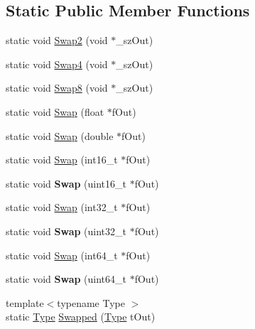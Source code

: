 \subsection*{Static Public Member Functions}
\begin{DoxyCompactItemize}
\item 
static void \hyperlink{class_assimp_1_1_byte_swap_abacbb767ce53adb84d19e6adae7d5b1d}{Swap2} (void $\ast$\+\_\+sz\+Out)
\item 
static void \hyperlink{class_assimp_1_1_byte_swap_a6717939ed8be817f262515c3c1ae2d77}{Swap4} (void $\ast$\+\_\+sz\+Out)
\item 
static void \hyperlink{class_assimp_1_1_byte_swap_a2bc7200bc6ead695450266621ee114e3}{Swap8} (void $\ast$\+\_\+sz\+Out)
\item 
static void \hyperlink{class_assimp_1_1_byte_swap_a6e60cdda6ebc1db17759106023f38270}{Swap} (float $\ast$f\+Out)
\item 
static void \hyperlink{class_assimp_1_1_byte_swap_a388a44886b50f43198f575918bfe3c7f}{Swap} (double $\ast$f\+Out)
\item 
static void \hyperlink{class_assimp_1_1_byte_swap_a3ea83a13aef538fa962eabd313ab3d3f}{Swap} (int16\+\_\+t $\ast$f\+Out)
\item 
\hypertarget{class_assimp_1_1_byte_swap_a1aef62ff32cb526202f493f8148b2fb5}{static void {\bfseries Swap} (uint16\+\_\+t $\ast$f\+Out)}\label{class_assimp_1_1_byte_swap_a1aef62ff32cb526202f493f8148b2fb5}

\item 
static void \hyperlink{class_assimp_1_1_byte_swap_ad29a3964bab3f260c8a9933e0d85ef10}{Swap} (int32\+\_\+t $\ast$f\+Out)
\item 
\hypertarget{class_assimp_1_1_byte_swap_a80873669c59df2c0ba8dd38409786164}{static void {\bfseries Swap} (uint32\+\_\+t $\ast$f\+Out)}\label{class_assimp_1_1_byte_swap_a80873669c59df2c0ba8dd38409786164}

\item 
static void \hyperlink{class_assimp_1_1_byte_swap_a1532aae48d9c5d782ed52a6ca900e71b}{Swap} (int64\+\_\+t $\ast$f\+Out)
\item 
\hypertarget{class_assimp_1_1_byte_swap_ab4df852754e09255c4bf6cbd12a1b1a1}{static void {\bfseries Swap} (uint64\+\_\+t $\ast$f\+Out)}\label{class_assimp_1_1_byte_swap_ab4df852754e09255c4bf6cbd12a1b1a1}

\item 
{\footnotesize template$<$typename Type $>$ }\\static \hyperlink{struct_type}{Type} \hyperlink{class_assimp_1_1_byte_swap_a9b627a52b5fa630c20fc5bb6a5cd455e}{Swapped} (\hyperlink{struct_type}{Type} t\+Out)
\end{DoxyCompactItemize}


